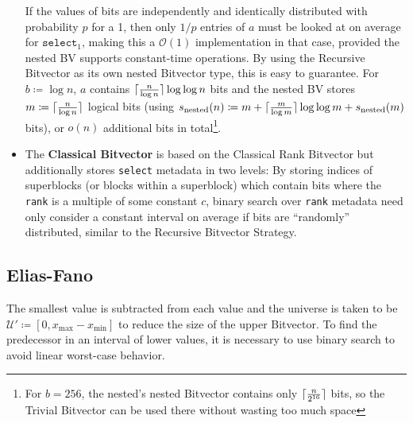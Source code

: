 \documentclass[a4paper,UKenglish,cleveref, autoref, thm-restate]{lipics-v2021}
\newcommand{\rank} {\texttt{rank}}
\newcommand{\select} {\texttt{select}}
\DeclarePairedDelimiter{\ceil}{\lceil}{\rceil}
\begin{document}
\begin{itemize}
    If the values of bits are independently and identically distributed with probability $p$ for a 1, then only $1/p$ entries of $a$ must
    be looked at on average for $\select_1$, making this a $\mathcal O(1)$ implementation in that case,
    provided the nested BV supports constant-time operations.
    By using the Recursive Bitvector as its own nested Bitvector type, this is easy to guarantee.
    For $b \coloneqq \log n$, $a$ contains $\ceil{\frac{n}{\log n}} \log \log n$ bits and the nested BV
    stores $m \coloneqq \ceil{\frac{n}{\log n}}$ logical bits
    (using $s_\text{nested}(n)\coloneqq m + \ceil{\frac{m}{\log m}} \log \log m + s_\text{nested}(m)$ bits),
    or $o(n)$ additional bits in total\footnote{For $b=256$, the nested's nested Bitvector contains only $\ceil{\frac{n}{2^{16}}}$ bits, so the Trivial Bitvector can be used there without wasting too much space}.
    \item The \textbf{Classical Bitvector} is based on the Classical Rank Bitvector but additionally stores \select{} metadata in two levels:
    By storing indices of superblocks (or blocks within a superblock) which contain bits where the \rank{} is a multiple of some constant $c$,
    binary search over \rank{} metadata need only consider a constant interval on average if bits are \enquote{randomly} distributed,
    similar to the Recursive Bitvector Strategy.
\end{itemize}

\subsection{Elias-Fano}
The smallest value is subtracted from each value and the universe is taken to be $\mathcal U' \coloneqq [0, x_\text{max} - x_\text{min}]$
to reduce the size of the upper Bitvector.
To find the predecessor in an interval of lower values, it is necessary to use binary search to avoid linear worst-case behavior.
\end{document}
